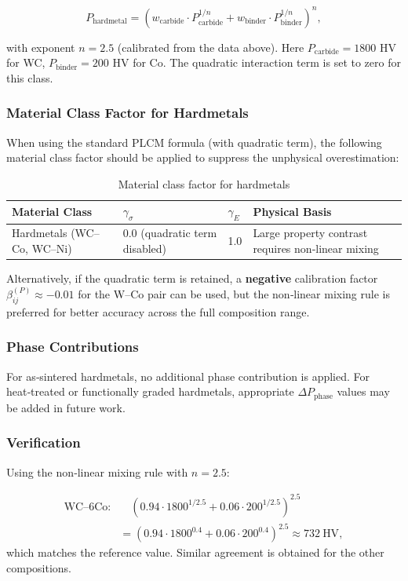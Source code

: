 \documentclass[12pt,a4paper]{article}
\begin{document}
	\[
	P_{\text{hardmetal}} = \left( w_{\text{carbide}} \cdot P_{\text{carbide}}^{1/n} + w_{\text{binder}} \cdot P_{\text{binder}}^{1/n} \right)^{n},
	\]
	
	with exponent $n = 2.5$ (calibrated from the data above). Here $P_{\text{carbide}} = 1800$ HV for WC, $P_{\text{binder}} = 200$ HV for Co. The quadratic interaction term is set to zero for this class.
	
	\subsubsection{Material Class Factor for Hardmetals}
	When using the standard PLCM formula (with quadratic term), the following material class factor should be applied to suppress the unphysical overestimation:
	
	\begin{longtable}{p{3.5cm} p{2.5cm} p{2.5cm} p{5cm}}
		\caption{Material class factor for hardmetals}\\
		\toprule
		\textbf{Material Class} & $\gamma_{\sigma}$ & $\gamma_{E}$ & \textbf{Physical Basis} \\
		\midrule
		Hardmetals (WC–Co, WC–Ni) & 0.0 (quadratic term disabled) & 1.0 & Large property contrast requires non‑linear mixing \\
		\bottomrule
	\end{longtable}
	
	Alternatively, if the quadratic term is retained, a \textbf{negative} calibration factor $\beta_{ij}^{(P)} \approx -0.01$ for the W–Co pair can be used, but the non‑linear mixing rule is preferred for better accuracy across the full composition range.
	
	\subsubsection{Phase Contributions}
	For as‑sintered hardmetals, no additional phase contribution is applied. For heat‑treated or functionally graded hardmetals, appropriate $\Delta P_{\text{phase}}$ values may be added in future work.
	
	\subsubsection{Verification}
	Using the non‑linear mixing rule with $n=2.5$:
	
	\[
	\begin{aligned}
		\text{WC–6Co:}&\quad (0.94\cdot1800^{1/2.5} + 0.06\cdot200^{1/2.5})^{2.5} \\
		&= (0.94\cdot1800^{0.4} + 0.06\cdot200^{0.4})^{2.5} \approx 732\ \text{HV},
	\end{aligned}
	\]
	which matches the reference value. Similar agreement is obtained for the other compositions.
	
\end{document}
